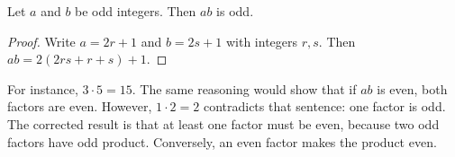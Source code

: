 \begin{proposition}\label{prop:odd-product}
Let $a$ and $b$ be odd integers. Then $ab$ is odd.
\end{proposition}
\begin{proof}
Write $a=2r+1$ and $b=2s+1$ with integers $r,s$.
Then $ab=2(2rs+r+s)+1$.
\end{proof}
For instance, $3\cdot5=15$.
The same reasoning would show that if $ab$ is even, both factors are even.
However, $1\cdot2=2$ contradicts that sentence: one factor is odd.
The corrected result is that at least one factor must be even, because two
odd factors have odd product. Conversely, an even factor makes the product even.
